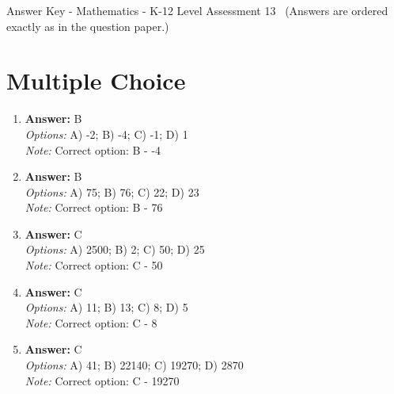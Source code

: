 \documentclass[12pt]{article}
\begin{document}
\begin{center}
Answer Key - Mathematics - K-12 Level Assessment 13 \
\small (Answers are ordered exactly as in the question paper.)
\end{center}

\section*{Multiple Choice}
\begin{enumerate}[label=\arabic*.]
\item \textbf{Answer:} B
\\ \textit{Options:} A) -2; B) -4; C) -1; D) 1
\\ \textit{Note:} Correct option: B - -4
\item \textbf{Answer:} B
\\ \textit{Options:} A) 75; B) 76; C) 22; D) 23
\\ \textit{Note:} Correct option: B - 76
\item \textbf{Answer:} C
\\ \textit{Options:} A) 2500; B) 2; C) 50; D) 25
\\ \textit{Note:} Correct option: C - 50
\item \textbf{Answer:} C
\\ \textit{Options:} A) 11; B) 13; C) 8; D) 5
\\ \textit{Note:} Correct option: C - 8
\item \textbf{Answer:} C
\\ \textit{Options:} A) 41; B) 22140; C) 19270; D) 2870
\\ \textit{Note:} Correct option: C - 19270
\end{enumerate}
\end{document}
